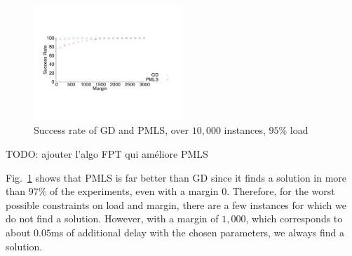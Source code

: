 \documentclass[10pt, conference, letterpaper]{IEEEtran}
\newcommand{\todo}[1]{{\color{red} TODO: {#1}}}
\begin{document}
    \begin{figure} [h] 
       \begin{center}
      \includegraphics[width=0.5\textwidth]{retour_21000.pdf}
      \end{center}
      \caption{Success rate of GD and PMLS, over $10,000$ instances, $95\%$ load}
     \label{fig:success21000}
     \end{figure}
     
     \todo{ajouter l'algo FPT qui améliore PMLS}

Fig.~\ref{fig:success21000} shows that PMLS is far better than GD since it finds a solution in more than $97\%$ of the experiments, even with a margin $0$. Therefore, for the worst possible constraints on load and margin, there are a few instances for which we do not find a solution. However, with a margin of $1,000$, which corresponds to about $0.05$ms of additional delay with the chosen parameters, we always find a solution. 
     
\end{document}
